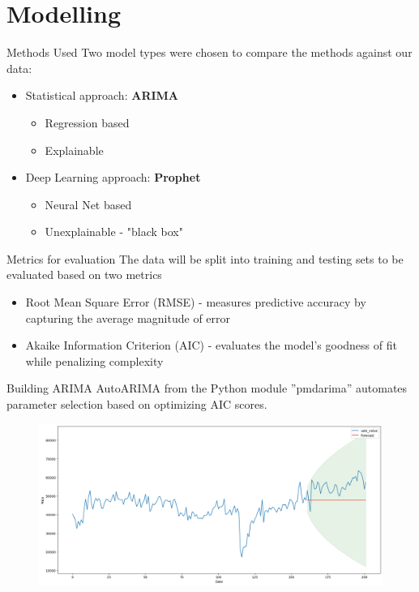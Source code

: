 \documentclass[9pt, dvipsnames]{beamer}
\begin{document}
\section{Modelling}
    \begin{frame}{Methods Used}
        Two model types were chosen to compare the methods against our data: \pause
        \begin{itemize}
            \item
                Statistical approach: \textbf{ARIMA}
                \begin{itemize}
                    \item Regression based
                    \item Explainable \pause
                \end{itemize}
            \item
                Deep Learning approach: \textbf{Prophet}
                \begin{itemize}
                    \item Neural Net based
                    \item Unexplainable - "black box"
                \end{itemize}
        \end{itemize}
    \end{frame}
    \begin{frame}{Metrics for evaluation}
        The data will be split into training and testing sets to be evaluated based on two metrics \pause
        \begin{itemize}
            \item Root Mean Square Error (RMSE) - measures predictive accuracy by capturing the average 
            magnitude of error \pause
            \item Akaike Information Criterion (AIC) - evaluates the model’s goodness of fit while penalizing 
            complexity
        \end{itemize}
    \end{frame}
    \begin{frame}{Building ARIMA}
        AutoARIMA from the Python module ”pmdarima” automates parameter selection based on optimizing AIC 
        scores.
        \begin{figure}
            \centering
            \includegraphics[height=0.47\paperheight]{assets/ARIMA-Weekly.png}
            \label{fig:ARIMA-Weekly}
        \end{figure}
    \end{frame}
\end{document}
